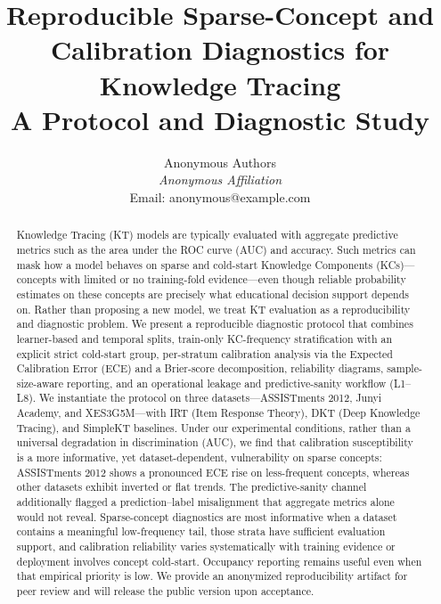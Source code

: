 \documentclass[12pt,a4paper]{jedm}
\begin{document}
\title{\sffamily\bfseries Reproducible Sparse-Concept and Calibration Diagnostics for Knowledge Tracing\\
{\large A Protocol and Diagnostic Study}}

\author{
\sffamily Anonymous Authors\\[8pt]
\normalsize \textit{Anonymous Affiliation}\\
\normalsize Email: anonymous@example.com
}
\date{}

\maketitle

\begin{abstract}
Knowledge Tracing (KT) models are typically evaluated with aggregate predictive metrics such as the area under the ROC curve (AUC) and accuracy. Such metrics can mask how a model behaves on sparse and cold-start Knowledge Components (KCs)---concepts with limited or no training-fold evidence---even though reliable probability estimates on these concepts are precisely what educational decision support depends on. Rather than proposing a new model, we treat KT evaluation as a reproducibility and diagnostic problem. We present a reproducible diagnostic protocol that combines learner-based and temporal splits, train-only KC-frequency stratification with an explicit strict cold-start group, per-stratum calibration analysis via the Expected Calibration Error (ECE) and a Brier-score decomposition, reliability diagrams, sample-size-aware reporting, and an operational leakage and predictive-sanity workflow (L1--L8). We instantiate the protocol on three datasets---ASSISTments 2012, Junyi Academy, and XES3G5M---with IRT (Item Response Theory), DKT (Deep Knowledge Tracing), and SimpleKT baselines. Under our experimental conditions, rather than a universal degradation in discrimination (AUC), we find that calibration susceptibility is a more informative, yet dataset-dependent, vulnerability on sparse concepts: ASSISTments 2012 shows a pronounced ECE rise on less-frequent concepts, whereas other datasets exhibit inverted or flat trends. The predictive-sanity channel additionally flagged a prediction--label misalignment that aggregate metrics alone would not reveal. Sparse-concept diagnostics are most informative when a dataset contains a meaningful low-frequency tail, those strata have sufficient evaluation support, and calibration reliability varies systematically with training evidence or deployment involves concept cold-start. Occupancy reporting remains useful even when that empirical priority is low. We provide an anonymized reproducibility artifact for peer review and will release the public version upon acceptance.
\end{abstract}
\end{document}
